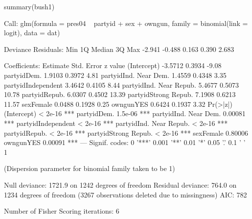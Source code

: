 \begin{Schunk}
\begin{Sinput}
 summary(bush1)
\end{Sinput}
\begin{Soutput}
Call:
glm(formula = pres04 ~ partyid + sex + owngun, family = binomial(link = logit), 
    data = dat)

Deviance Residuals: 
   Min      1Q  Median      3Q     Max  
-2.941  -0.488   0.163   0.390   2.683  

Coefficients:
                        Estimate Std. Error z value
(Intercept)              -3.5712     0.3934   -9.08
partyidDem.               1.9103     0.3972    4.81
partyidInd. Near Dem.     1.4559     0.4348    3.35
partyidIndependent        3.4642     0.4105    8.44
partyidInd. Near Repub.   5.4677     0.5073   10.78
partyidRepub.             6.0307     0.4502   13.39
partyidStrong Repub.      7.1908     0.6213   11.57
sexFemale                 0.0488     0.1928    0.25
owngunYES                 0.6424     0.1937    3.32
                        Pr(>|z|)    
(Intercept)              < 2e-16 ***
partyidDem.              1.5e-06 ***
partyidInd. Near Dem.    0.00081 ***
partyidIndependent       < 2e-16 ***
partyidInd. Near Repub.  < 2e-16 ***
partyidRepub.            < 2e-16 ***
partyidStrong Repub.     < 2e-16 ***
sexFemale                0.80006    
owngunYES                0.00091 ***
---
Signif. codes:  0 '***' 0.001 '**' 0.01 '*' 0.05 '.' 0.1 ' ' 1 

(Dispersion parameter for binomial family taken to be 1)

    Null deviance: 1721.9  on 1242  degrees of freedom
Residual deviance:  764.0  on 1234  degrees of freedom
  (3267 observations deleted due to missingness)
AIC: 782

Number of Fisher Scoring iterations: 6
\end{Soutput}
\end{Schunk}
